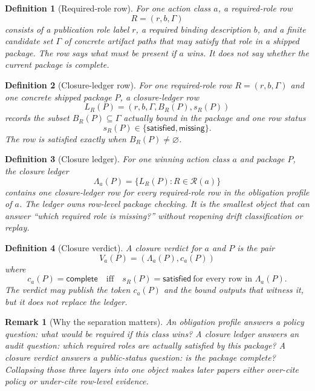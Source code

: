\documentclass[11pt]{article}
\newtheorem{definition}{Definition}
\newtheorem{remark}{Remark}
\begin{document}
\begin{definition}[Required-role row]
For one action class $a$, a \emph{required-role row}
\[
R=(r,b,\Gamma)
\]
consists of a publication role label $r$, a required binding description $b$, and a finite candidate set $\Gamma$ of concrete artifact paths that may satisfy that role in a shipped package.
The row says what must be present if $a$ wins.
It does not say whether the current package is complete.
\end{definition}

\begin{definition}[Closure-ledger row]
For one required-role row $R=(r,b,\Gamma)$ and one concrete shipped package $P$, a \emph{closure-ledger row}
\[
L_R(P)=(r,b,\Gamma,B_R(P),s_R(P))
\]
records the subset $B_R(P)\subseteq \Gamma$ actually bound in the package and one row status
\[
s_R(P)\in\{\textsf{satisfied},\textsf{missing}\}.
\]
The row is satisfied exactly when $B_R(P)\neq \varnothing$.
\end{definition}

\begin{definition}[Closure ledger]
For one winning action class $a$ and package $P$, the \emph{closure ledger}
\[
\Lambda_a(P)=\{L_R(P): R \in \mathcal R(a)\}
\]
contains one closure-ledger row for every required-role row in the obligation profile of $a$.
The ledger owns row-level package checking.
It is the smallest object that can answer ``which required role is missing?'' without reopening drift classification or replay.
\end{definition}

\begin{definition}[Closure verdict]
A \emph{closure verdict} for $a$ and $P$ is the pair
\[
V_a(P)=(\Lambda_a(P), c_a(P))
\]
where
\[
c_a(P)=\textsf{complete}
\quad\text{iff}\quad
s_R(P)=\textsf{satisfied}\ \text{for every row in }\Lambda_a(P).
\]
The verdict may publish the token $c_a(P)$ and the bound outputs that witness it, but it does not replace the ledger.
\end{definition}

\begin{remark}[Why the separation matters]
An obligation profile answers a policy question: \emph{what would be required if this class wins?}
A closure ledger answers an audit question: \emph{which required roles are actually satisfied by this package?}
A closure verdict answers a public-status question: \emph{is the package complete?}
Collapsing those three layers into one object makes later papers either over-cite policy or under-cite row-level evidence.
\end{remark}
\end{document}
